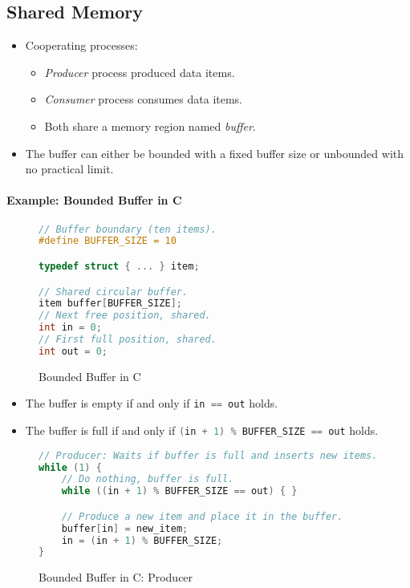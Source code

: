 		\subsection{Shared Memory}
			\begin{itemize}
				\item Cooperating processes:
					\begin{itemize}
						\item \textit{Producer} process produced data items.
						\item \textit{Consumer} process consumes data items.
						\item Both share a memory region named \textit{buffer}.
					\end{itemize}
				\item The buffer can either be bounded with a fixed buffer size or unbounded with no practical limit.
			\end{itemize}

			\paragraph{Example: Bounded Buffer in C}
				\begin{figure}[H]
					\centering
					\begin{lstlisting}[language = C]
// Buffer boundary (ten items).
#define BUFFER_SIZE = 10

typedef struct { ... } item;

// Shared circular buffer.
item buffer[BUFFER_SIZE];
// Next free position, shared.
int in = 0;
// First full position, shared.
int out = 0;
\end{lstlisting}
					\caption{Bounded Buffer in C}
				\end{figure}
				\begin{itemize}
					\item The buffer is empty if and only if \lstinline[language = C]|in == out| holds.
					\item The buffer is full if and only if \lstinline[language = C]|(in + 1) % BUFFER_SIZE == out| holds.
				\end{itemize}

				\begin{figure}[H]
					\centering
					\begin{lstlisting}[language = C]
// Producer: Waits if buffer is full and inserts new items.
while (1) {
	// Do nothing, buffer is full.
	while ((in + 1) % BUFFER_SIZE == out) { }

	// Produce a new item and place it in the buffer.
	buffer[in] = new_item;
	in = (in + 1) % BUFFER_SIZE;
}
\end{lstlisting}
					\caption{Bounded Buffer in C: Producer}
				\end{figure}

